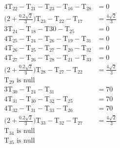 \documentclass[12pt,a4paper]{article}
\begin{document}
\begin{align*}
4\text{T}_{22}-\text{T}_{21}-\text{T}_{23}-\text{T}_{16}-\text{T}_{28} & =0\\
\bigg(2+\frac{0.2\sqrt{2}}{3}\bigg)\text{T}_{23}-\text{T}_{22}-\text{T}_{17} & =\frac{4\sqrt{2}}{3}\\
3\text{T}_{24}-\text{T}_{18}-\text{T}{30}-\text{T}_{25} &=0\\
4\text{T}_{25}-\text{T}_{24}-\text{T}_{26}-\text{T}_{19}-\text{T}_{31} & =0\\
4\text{T}_{26}-\text{T}_{25}-\text{T}_{27}-\text{T}_{20}-\text{T}_{32} & =0\\
4\text{T}_{27}-\text{T}_{26}-\text{T}_{28}-\text{T}_{21}-\text{T}_{33} & =0\\
\bigg(2+\frac{0.2\sqrt{2}}{3}\bigg)\text{T}_{28}-\text{T}_{27}-\text{T}_{22} & =\frac{4\sqrt{2}}{3}\\
\text{T}_{29} \text{ is null}\\
3\text{T}_{30}-\text{T}_{24}-\text{T}_{31} &=70\\
4\text{T}_{31}-\text{T}_{30}-\text{T}_{32}-\text{T}_{25} &=70\\
4\text{T}_{32}-\text{T}_{31}-\text{T}_{33}-\text{T}_{26} &=70\\
\bigg(2+\frac{0.2\sqrt{2}}{3}\bigg)\text{T}_{33}-\text{T}_{32}-\text{T}_{27} & =\frac{4\sqrt{2}}{3}\\
\text{T}_{34} \text{ is null}\\
\text{T}_{35} \text{ is null}
\end{align*}
\end{document}
